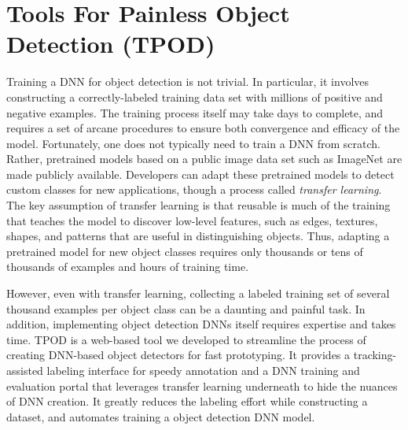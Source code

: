\section{Tools For Painless Object Detection (TPOD)}
\label{sec: app-dev-tpod}

Training a DNN for object detection is not trivial.  In particular, it involves
constructing a correctly-labeled training data set with millions of positive and
negative examples. The training process itself may take days to complete, and
requires a set of arcane procedures to ensure both convergence and efficacy of
the model. Fortunately, one does not typically need to train a DNN from scratch.
Rather, pretrained models based on a public image data set such as ImageNet are
made publicly available. Developers can adapt these pretrained models to detect
custom classes for new applications, though a process called \emph{transfer
learning}.  The key assumption of transfer learning is that reusable is much of
the training that teaches the model to discover low-level features, such as
edges, textures, shapes, and patterns that are useful in distinguishing objects.
Thus, adapting a pretrained model for new object classes requires only thousands
or tens of thousands of examples and hours of training time. 

However, even with transfer learning, collecting a labeled training set of
several thousand examples per object class can be a daunting and painful task.
In addition, implementing object detection DNNs itself requires expertise and
takes time. TPOD is a web-based tool we developed to streamline the process of
creating DNN-based object detectors for fast prototyping. It provides a
tracking-assisted labeling interface for speedy annotation and a DNN training
and evaluation portal that leverages transfer learning underneath to hide the
nuances of DNN creation. It greatly reduces the labeling effort while
constructing a dataset, and automates training a object detection DNN model.


